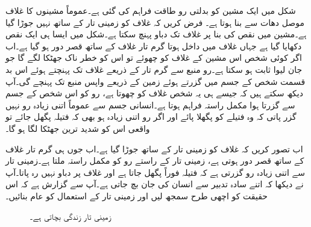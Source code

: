 شکل میں ایک مشین کو بدلتی رو طاقت فراہم کی گئی ہے۔عموماً مشینوں کا غلاف موصل دھات سے بنا ہوتا ہے۔ فرض کریں کہ غلاف کو زمینی تار کے ساتھ نہیں جوڑا گیا ہے۔مشین میں نقص کی بنا پر غلاف تک دباو پہنچ سکتا ہے۔شکل میں ایسا ہی ایک نقص دکھایا گیا ہے جہاں غلاف میں داخل ہوتا گرم تار غلاف کے ساتھ قصر دور ہو گیا ہے۔اب اگر کوئی شخص اس مشین کے غلاف کو چھوئے تو اس کو خطر ناک جھٹکا لگے گا جو جان لیوا ثابت ہو سکتا ہے۔رو منبع سے گرم تار کے ذریعے غلاف تک پہنچتے ہوئے اس بد قسمت شخص کے جسم میں گزرتے ہوئے زمین کے ذریعے واپس منبع تک پہنچے گی۔آپ دیکھ سکتے ہیں کہ جیسے ہی یہ شخص غلاف کو چھوتا ہے، رو کو اس شخص کے جسم سے گزرتا ہوا مکمل راستہ فراہم ہوتا ہے۔انسانی جسم سے عموماً اتنی زیادہ رو نہیں گزر پاتی کہ وہ فتیلے کو پگھلا پائے اور اگر رو اتنی زیادہ ہو بھی کہ فتیلہ پگھل جائے تو واقعی اس کو شدید ترین جھٹکا لگا ہو گا۔

اب تصور کریں کہ غلاف کو زمینی تار کے ساتھ جوڑا گیا ہے۔اب جوں ہی گرم تار غلاف کے ساتھ قصر دور ہوتی ہے، زمینی تار کے راستے رو کو مکمل راستہ ملتا ہے۔زمینی تار  سے اتنی زیادہ رو گزرتی ہے کہ فتیلہ فوراً پگھل جاتا ہے اور غلاف پر دباو نہیں رہ پاتا۔آپ نے دیکھا کہ اتنے سادہ تدبیر سے انسان کی جان بچ جاتی ہے۔آپ سے گزارش ہے کہ اس حقیقت کو اچھی طرح سمجھ لیں اور زمینی تار کے استعمال کو عام بنائیں۔ 

\begin{figure}
\centering
{}
\caption{زمینی تار زندگی بچاتی ہے۔}
\label{شکل_طاقت_زمینی_تار_حفاظتی_اقدام}
\end{figure}

